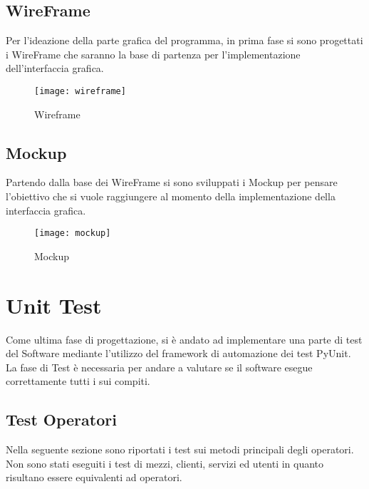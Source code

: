 \documentclass[green, fancy, 11pt]{elegantbook}
\begin{document}
\newpage
\section{WireFrame}
Per l'ideazione della parte grafica del programma, in prima fase si sono progettati i WireFrame che saranno la base di partenza per l'implementazione dell'interfaccia grafica.
\begin{figure}[H]
	\centering
	\texttt{[image: wireframe]}
	\caption{Wireframe}
\end{figure}

\newpage
\section{Mockup}
Partendo dalla base dei WireFrame si sono sviluppati i Mockup per pensare l'obiettivo che si vuole raggiungere al momento della implementazione della interfaccia grafica.
\begin{figure}[H]
	\centering
	\texttt{[image: mockup]}
	\caption{Mockup}
\end{figure}

\newpage
\chapter{Unit Test}
Come ultima fase di progettazione, si è andato ad implementare una parte di test del Software mediante l'utilizzo del framework di automazione dei test PyUnit. 
La fase di Test è necessaria per andare a valutare se il software esegue correttamente tutti i sui compiti.

\section{Test Operatori}
Nella seguente sezione sono riportati i test sui metodi principali degli operatori.
Non sono stati eseguiti i test di mezzi, clienti, servizi ed utenti in quanto risultano essere equivalenti ad operatori.
\end{document}
